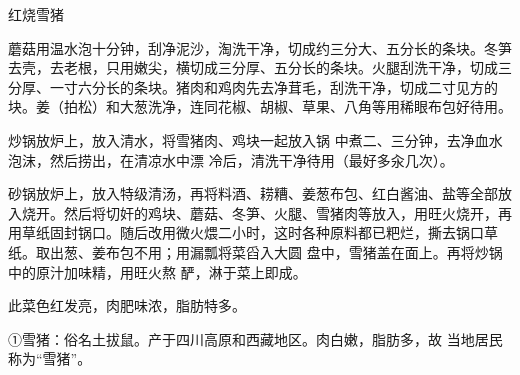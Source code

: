 \begin{recipe}{红烧雪猪}

\ingredients


\cooking

\step 蘑菇用温水泡十分钟，刮净泥沙，淘洗干净，切成约三分大、五分长的条块。冬笋去壳，去老根，只用嫩尖，横切成三分厚、五分长的条块。火腿刮洗干净，切成三分厚、一寸六分长的条块。猪肉和鸡肉先去净茸毛，刮洗干净，切成二寸见方的块。姜（拍松）和大葱洗净，连同花椒、胡椒、草果、八角等用稀眼布包好待用。

\step 炒锅放炉上，放入清水，将雪猪肉、鸡块一起放入锅
中煮二、三分钟，去净血水泡沫，然后捞出，在清凉水中漂 冷后，清洗干净待用（最好多汆几次）。

\step 砂锅放炉上，放入特级清汤，再将料酒、耢糟、姜葱布包、红白酱油、盐等全部放入烧开。然后将切奸的鸡块、蘑菇、冬笋、火腿、雪猪肉等放入，用旺火烧开，再用草纸固封锅口。随后改用微火煨二小时，这时各种原料都已粑烂，撕去锅口草纸。取出葱、姜布包不用；用漏瓢将菜舀入大圆
盘中，雪猪盖在面上。再将炒锅中的原汁加味精，用旺火熬 酽，淋于菜上即成。

\notes

此菜色红发亮，肉肥味浓，脂肪特多。

①雪猪：俗名土拔鼠。产于四川高原和西藏地区。肉白嫩，脂肪多，故 当地居民称为“雪猪”。

\end{recipe}

